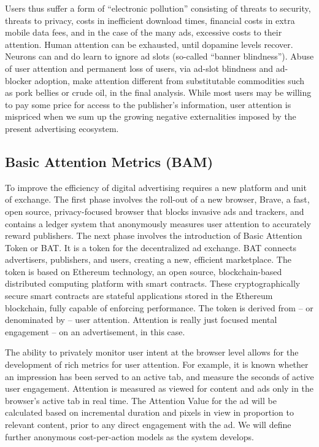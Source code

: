 \documentclass[11pt]{article}
\begin{document}
Users thus suffer a form of ``electronic pollution'' consisting of threats to security, threats to privacy, costs in inefficient download times, financial costs in extra mobile data fees, and in the case of the many ads, excessive costs to their attention. Human attention can be exhausted, until dopamine levels recover. Neurons can and do learn to ignore ad slots (so-called ``banner blindness''). Abuse of user attention and permanent loss of users, via ad-slot blindness and ad-blocker adoption, make attention different from substitutable commodities such as pork bellies or crude oil, in the final analysis. While most users may be willing to pay some price for access to the publisher's information, user attention is mispriced when we sum up the growing negative externalities imposed by the present advertising ecosystem.

\subsection{Basic Attention Metrics (BAM)}
\label{sec-4-1}

To improve the efficiency of digital advertising requires a new platform and unit of exchange. The first phase involves the roll-out of a new browser, Brave, a fast, open source, privacy-focused browser that blocks invasive ads and trackers, and contains a ledger system that anonymously measures user attention to accurately reward publishers. The next phase involves the introduction of Basic Attention Token or \textrm{BAT}. It is a token for the decentralized ad exchange. \textrm{BAT} connects advertisers, publishers, and users, creating a new, efficient marketplace. The token is based on Ethereum technology, an open source, blockchain-based distributed computing platform with smart contracts. These cryptographically secure smart contracts are stateful applications stored in the Ethereum blockchain, fully capable of enforcing performance. The token is derived from -- or denominated by -- user attention. Attention is really just focused mental engagement -- on an advertisement, in this case.

The ability to privately monitor user intent at the browser level allows for the development of rich metrics for user attention. For example, it is known whether an impression has been served to an active tab, and measure the seconds of active user engagement. Attention is measured as viewed for content and ads only in the browser's active tab in real time. The Attention Value for the ad will be calculated based on incremental duration and pixels in view in proportion to relevant content, prior to any direct engagement with the ad. We will define further anonymous cost-per-action models as the system develops.
\end{document}
